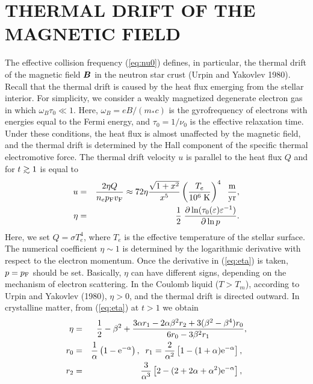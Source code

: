 \section{THERMAL DRIFT OF THE MAGNETIC FIELD}
%
The effective collision frequency (\ref{eq:nu0}) defines, 
in particular, the thermal drift of the magnetic field $\mbox{\boldmath $B$}$ 
in the neutron star crust (Urpin and Yakovlev 1980). 
Recall that the thermal drift is caused by the heat flux emerging 
from the stellar interior. For simplicity, we consider a weakly 
magnetized degenerate electron gas in which $\omega_B \tau_0 \ll 1$. 
Here, $\omega_B = eB/(m_\ast c)$ is the gyrofrequency
of electrons with energies equal to the Fermi energy, and $\tau_0=1/\nu_0$
is the effective relaxation time. Under these conditions, the
heat flux is almost unaffected by the magnetic field, and the
thermal drift is determined by the Hall component of the specific
thermal electromotive force. The thermal drift velocity $u$ is
parallel to the heat flux $Q$ and for $t \ga 1$ is equal to
%
\begin{eqnarray}
    u & = & {2 \eta Q \over n_e p_{\rm F} v_{\rm F}}
        \approx 72 \eta {\sqrt{1+x^2} \over x^5}
         \left( {T_e \over 10^6 \;{\rm K} }  \right)^4 \;\;
        {\rm m \over yr} ,
\label{eq:u} \\
    \eta & = & {1 \over 2} \; {
            \partial \ln(\tau_0(\varepsilon) \varepsilon^{-1})
           \over \partial \ln p}.
\label{eq:eta}
\end{eqnarray}
%
Here, we set $Q=\sigma T_e^4$, where $T_e$ is the effective temperature 
of the stellar surface. The numerical coefficient $\eta \sim 1$ is determined
by the logarithmic derivative with respect to the electron
momentum. Once the derivative in (\ref{eq:eta}) is taken, 
$p=p_{\rm F}$ should be set. Basically, $\eta$ can have different signs, 
depending on the mechanism of electron  scattering. 
In the Coulomb liquid ($T > T_m$), according to Urpin and Yakovlev 
(1980), $\eta > 0$, and the thermal drift is directed outward. 
In crystalline matter, from (\ref{eq:eta}) at $t > 1$ we obtain
%
\begin{eqnarray}
     \eta &= &{1 \over 2} - \beta^2 + {3 \alpha r_1 - 2 \alpha \beta^2 r_2
             +3 ( \beta^2 - \beta^4)r_0 \over 6 r_0 - 3 \beta^2 r_1} ,
\label{eq:eta1} \\
     r_0 & = & {1 \over \alpha} \left( 1- {\rm e}^{-\alpha} \right), \; \;
     r_1 = {2 \over \alpha^2} \left[1-(1+\alpha)
           {\rm e}^{-\alpha} \right], \; \;
\nonumber \\
    r_2 & = & {3 \over \alpha^3} \left[2 - (2+2 \alpha + \alpha^2)
           {\rm e}^{-\alpha} \right], \; \;
\label{eq:r}
\end{eqnarray}
